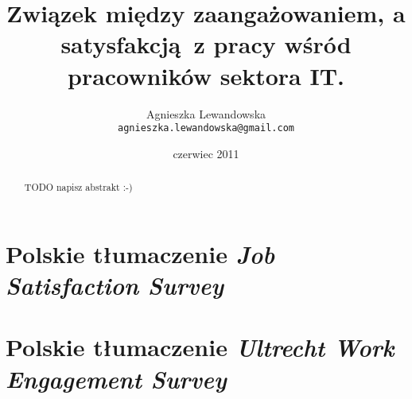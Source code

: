 \documentclass[a4paper,11pt,titlepage]{article}
\begin{document}
\title{Związek między zaangażowaniem, a satysfakcją~z pracy wśród pracowników sektora IT.}
\author{\Large{Agnieszka Lewandowska} \\ \texttt{agnieszka.lewandowska@gmail.com} }
\date{czerwiec 2011}
\maketitle

\begin{abstract}
TODO napisz abstrakt :-)
\end{abstract}

\tableofcontents
\cleardoublepage

\graphicspath{{img/}}










\cleardoublepage
\appendix
\section{Polskie tłumaczenie \emph{Job Satisfaction Survey}}
\section{Polskie tłumaczenie \emph{Ultrecht Work Engagement Survey}}
\end{document}
